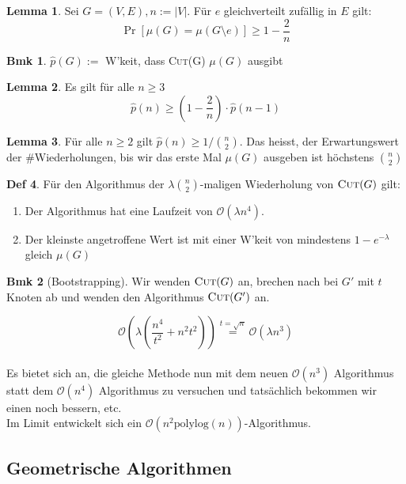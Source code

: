 \documentclass[a4paper, 10pt]{article}
\theoremstyle{definition}
\newtheorem{definition}{Def}[section]
\newtheorem{nlemma}[definition]{Lemma}
\newtheorem*{note}{Bmk}
\theoremstyle{named}
\newcommand{\BO}{\mathcal{O}}
\begin{document}
\begin{nlemma}
    Sei $G = (V, E), n := |V|$. Für $e$ gleichverteilt zufällig in $E$ gilt:
    $$\Pr[\mu(G) = \mu(G \setminus e)] \geq 1 - \frac{2}{n}$$
\end{nlemma}

\begin{note}
    $\hat{p}(G) :=$ W'keit, dass \textsc{Cut}(G) $\mu(G)$ ausgibt
\end{note}

\begin{nlemma}
    Es gilt für alle $n \geq 3$
    $$\hat{p}(n) \geq (1 - \frac{2}{n}) \cdot \hat{p}(n - 1)$$
\end{nlemma}

\begin{nlemma}
    Für alle $n \geq 2$ gilt $\hat{p}(n) \geq 1 / \binom{n}{2}$. Das heisst, der Erwartungswert der \#Wiederholungen, bis wir das erste Mal $\mu(G)$ ausgeben ist höchstens $\binom{n}{2}$
\end{nlemma}

\begin{definition}
    Für den Algorithmus der $\lambda \binom{n}{2}$-maligen Wiederholung von $\textsc{Cut}(G)$ gilt:
    \begin{enumerate}
        \item Der Algorithmus hat eine Laufzeit von $\BO(\lambda n^4)$.
        \item Der kleinste angetroffene Wert ist mit einer W'keit von mindestens $1 - e^{-\lambda}$ gleich $\mu(G)$
    \end{enumerate}
\end{definition}

\begin{note}[Bootstrapping]
    Wir wenden $\textsc{Cut}(G)$ an, brechen nach bei $G'$ mit $t$ Knoten ab und wenden den Algorithmus $\textsc{Cut}(G')$ an.

    $$\BO(\lambda \left(\frac{n^4}{t^2} + n^2 t^2\right)) \overset{t = \sqrt{n}}{=} \BO(\lambda n^3)$$
    \\ Es bietet sich an, die gleiche Methode nun mit dem neuen $\BO(n^3)$ Algorithmus statt dem $\BO(n^4)$ Algorithmus zu versuchen und tatsächlich bekommen wir einen noch bessern, etc.
    \\ Im Limit entwickelt sich ein $\BO(n^2 \text{polylog}(n))$-Algorithmus.
\end{note}

\subsection{Geometrische Algorithmen}
\end{document}
